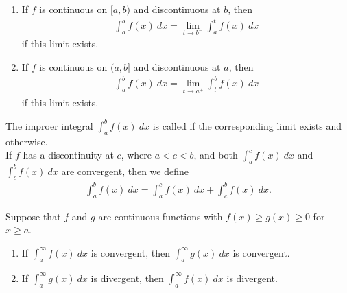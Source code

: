 \documentclass{article}
\begin{document}
\begin{definition}
    \begin{enumerate}
        \item If $f$ is continuous on $[a,b)$ and discontinuous at $b$, then
        \begin{align*}
            \int_a^b f(x)\:dx = \lim_{t\to b^-}\int_a^t f(x)\: dx
        \end{align*}
        if this limit exists.
        \item If $f$ is continuous on $(a,b]$ and discontinuous at $a$, then
        \begin{align*}
            \int_a^b f(x)\:dx = \lim_{t\to a^+}\int_t^b f(x)\: dx
        \end{align*}
        if this limit exists.
    \end{enumerate}
    The improer integral $\int_a^b f(x)\:dx$ is called  if the corresponding limit exists and  otherwise.\\
    If $f$ has a discontinuity at $c$, where $a<c<b$, and both $\int_a^c f(x)\:dx$ and $\int_c^b f(x)\:dx$ are convergent, then we define
    \begin{align*}
        \int_a^b f(x)\: dx = \int_a^c f(x)\:dx + \int_c^b f(x)\:dx.
    \end{align*}
\end{definition}
\begin{theorem}
     Suppose that $f$ and $g$ are continuous functions with $f(x)\geq g(x)\geq 0$ for $x\geq a$.
    \begin{enumerate}
        \item If $\int_a^\infty f(x)\:dx$ is convergent, then $\int_a^\infty g(x)\:dx$ is convergent.
        \item If $\int_a^\infty g(x)\:dx$ is divergent, then $\int_a^\infty f(x)\:dx$ is divergent.
    \end{enumerate}
\end{theorem}
\end{document}
